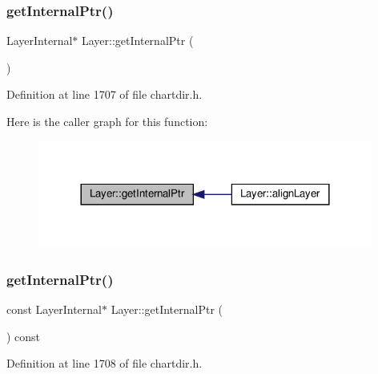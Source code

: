 \subsubsection{\texorpdfstring{get\+Internal\+Ptr()}{getInternalPtr()}\hspace{0.1cm}{\footnotesize\ttfamily [1/2]}}
{\footnotesize\ttfamily Layer\+Internal$\ast$ Layer\+::get\+Internal\+Ptr (\begin{DoxyParamCaption}{ }\end{DoxyParamCaption})\hspace{0.3cm}{\ttfamily [inline]}}



Definition at line 1707 of file chartdir.\+h.

Here is the caller graph for this function\+:
\nopagebreak
\begin{figure}[H]
\begin{center}
\leavevmode
\includegraphics[width=312pt]{class_layer_abac4fdc0a21c39be0ac30f0d2448c3ff_icgraph}
\end{center}
\end{figure}
\mbox{\label{class_layer_a52fb5ed2d62c31236f16a81bafe76e01}} 
\subsubsection{\texorpdfstring{get\+Internal\+Ptr()}{getInternalPtr()}\hspace{0.1cm}{\footnotesize\ttfamily [2/2]}}
{\footnotesize\ttfamily const Layer\+Internal$\ast$ Layer\+::get\+Internal\+Ptr (\begin{DoxyParamCaption}{ }\end{DoxyParamCaption}) const\hspace{0.3cm}{\ttfamily [inline]}}



Definition at line 1708 of file chartdir.\+h.

\mbox{\label{class_layer_aed467bc0e94be04708d50397cd9d068e}} 
